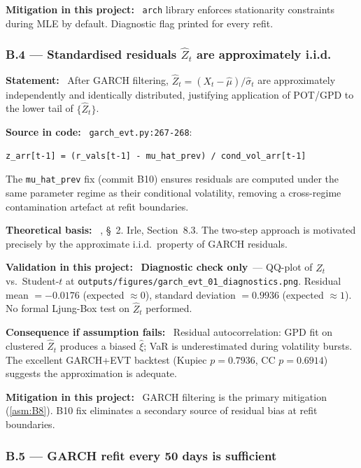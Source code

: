\documentclass[11pt,a4paper]{article}
\newcommand{\asmfield}[1]{\medskip\noindent\textbf{#1:}\ }
\newcommand{\code}[1]{\texttt{#1}}
\newcommand{\diagnostic}{\textbf{Diagnostic check only}}
\begin{document}
\asmfield{Mitigation in this project}
\code{arch} library enforces stationarity constraints during MLE by
default. Diagnostic flag printed for every refit.

\subsubsection{B.4 --- Standardised residuals $\hat{Z}_t$ are approximately i.i.d.}\label{asm:B4}

\asmfield{Statement}
After GARCH filtering, $\hat{Z}_t = (X_t - \hat{\mu})/\hat{\sigma}_t$
are approximately independently and identically distributed, justifying
application of POT/GPD to the lower tail of $\{\hat{Z}_t\}$.

\asmfield{Source in code}
\code{garch\_evt.py:267-268}:
\begin{lstlisting}
z_arr[t-1] = (r_vals[t-1] - mu_hat_prev) / cond_vol_arr[t-1]
\end{lstlisting}
The \code{mu\_hat\_prev} fix (commit B10) ensures residuals are computed
under the same parameter regime as their conditional volatility, removing
a cross-regime contamination artefact at refit boundaries.

\asmfield{Theoretical basis}
\cite{McNeilFrey2000}, \S~2. Irle, Section~8.3. The two-step approach is
motivated precisely by the approximate i.i.d.\ property of GARCH residuals.

\asmfield{Validation in this project}
\diagnostic\ --- QQ-plot of $\hat{Z}_t$ vs.\ Student-$t$ at
\code{outputs/figures/garch\_evt\_01\_diagnostics.png}. Residual mean
$= -0.0176$ (expected $\approx 0$), standard deviation $= 0.9936$
(expected $\approx 1$). No formal Ljung-Box test on $\hat{Z}_t$ performed.

\asmfield{Consequence if assumption fails}
Residual autocorrelation: GPD fit on clustered $\hat{Z}_t$ produces a
biased $\hat{\xi}$; VaR is underestimated during volatility bursts. The
excellent GARCH+EVT backtest (Kupiec $p = 0.7936$, CC $p = 0.6914$)
suggests the approximation is adequate.

\asmfield{Mitigation in this project}
GARCH filtering is the primary mitigation (\cref{asm:B8}). B10 fix
eliminates a secondary source of residual bias at refit boundaries.

\subsubsection{B.5 --- GARCH refit every 50 days is sufficient}\label{asm:B5}
\end{document}
